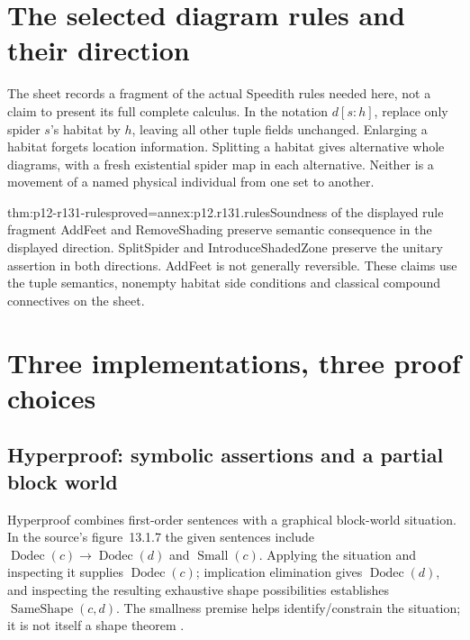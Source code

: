 \section{The selected diagram rules and their direction}



The sheet records a fragment of the actual Speedith rules needed here,
not a claim to present its full complete calculus. In the notation
\(d[s:h]\), replace only spider \(s\)'s habitat by \(h\), leaving
all other tuple fields unchanged. Enlarging a habitat forgets location
information. Splitting a habitat gives alternative whole diagrams,
with a fresh existential spider map in each alternative. Neither is a
movement of a named physical individual from one set to another.

\begin{hbtheorem}{thm:p12-r131-rules}{proved=annex:p12.r131.rules}{Soundness of the displayed rule fragment}
AddFeet and RemoveShading preserve semantic consequence in the displayed
direction. SplitSpider and IntroduceShadedZone preserve the unitary
assertion in both directions. AddFeet is not generally reversible.
These claims use the tuple semantics, nonempty habitat side conditions
and classical compound connectives on the sheet.
\end{hbtheorem}

\section{Three implementations, three proof choices}

\subsection{Hyperproof: symbolic assertions and a partial block world}

Hyperproof combines first-order sentences with a graphical block-world
situation. In the source's figure~13.1.7 the given sentences include
\(\operatorname{Dodec}(c)\to\operatorname{Dodec}(d)\) and
\(\operatorname{Small}(c)\). Applying the situation and inspecting it
supplies \(\operatorname{Dodec}(c)\); implication elimination gives
\(\operatorname{Dodec}(d)\), and inspecting the resulting exhaustive
shape possibilities establishes \(\operatorname{SameShape}(c,d)\).
The smallness premise helps identify/constrain the situation; it is not
itself a shape theorem \cite[p.~719]{Jamnik2021LogicalDiagrams}.

